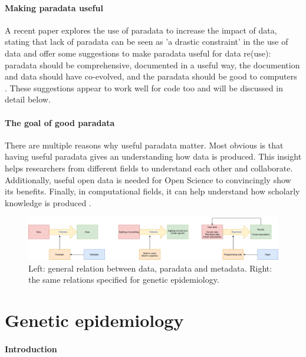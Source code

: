 \paragraph{Making paradata useful}

A recent paper explores the use of paradata to increase the impact of data,
stating that lack of paradata can be seen as 'a drastic constraint'
in the use of data and offer some suggestions to 
make paradata useful for data re(use):
paradata should be comprehensive, documented in a useful way, 
the documention and data should have co-evolved, 
and the paradata should be good to computers \cite{huvila2022improving}.
These suggestions appear to work well for code too
and will be discussed in detail below.

\paragraph{The goal of good paradata}

There are multiple reasons why useful paradata matter. 
Most obvious is that having useful paradata gives an understanding how
data is produced.
This insight helps researchers from different fields to understand each other
and collaborate.
Additionally, useful open data is needed for Open Science to convincingly show
its benefits.
Finally, in computational fields, 
it can help understand how scholarly knowledge is produced
\cite{huvila2022improving}.

\begin{figure}[!htbp]
  \centering
  \includegraphics[width=\linewidth]{figure_1.png}
  \caption{
    Left: general relation between data, paradata and metadata.
    Right: the same relations specified for genetic epidemiology.
  }
  \label{fig:figure_1}
\end{figure}

\section{Genetic epidemiology}

\paragraph{Introduction}

